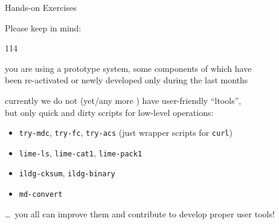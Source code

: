 \documentclass[aspectratio=169,xcolor=dvipsnames]{beamer}
\newcommand{\bi}{\begin{itemize}}
\newcommand{\ei}{\end{itemize}}
\begin{document}
\begin{frame}{Hands-on Exercises}

  Please keep in mind:
  
  \begin{dinglist}{114}

  \item you are using a prototype system, some components of which have\\
    been re-activated or newly developed only during the last months
    
  \item currently we do not (yet/any more ) have user-friendly ``ltools'',\\
    but only quick and dirty scripts for low-level operations:
    \bi
    \item {\tt try-mdc}, {\tt try-fc}, {\tt try-acs} (just wrapper scripts for {\tt curl})
    \item {\tt lime-ls}, {\tt lime-cat1}, {\tt lime-pack1}
    \item {\tt ildg-cksum}, {\tt ildg-binary}
    \item {\tt md-convert}
    \ei

    \ldots\ you all can improve them and contribute to develop proper user tools!
  \end{dinglist}

  \vfill
\end{frame}
\end{document}
